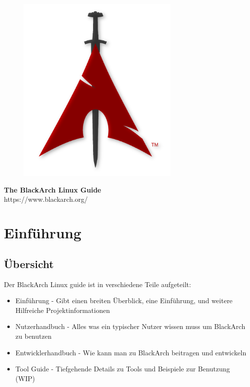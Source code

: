 \documentclass[a4paper, oneside, 11pt]{book}
\begin{document}
\pagestyle{empty}
\begin{center}
\begin{figure}[htbp]
\centering
\vspace{0.5cm}
\includegraphics[width=8cm]{images/logo.png}
\label{fig:logo}
\end{figure}
\vspace{0.5cm}
\Huge{\textbf{The BlackArch Linux Guide}}\\
\vspace{1cm}
\Large{\color{red}https://www.blackarch.org/}\\
\vspace{0.5cm}
\end{center}
\newpage
\tableofcontents
\newpage
\pagestyle{fancy}


\chapter{Einführung}

\section{Übersicht}
Der BlackArch Linux guide ist in verschiedene Teile aufgeteilt:
\begin{itemize}
\item Einführung - Gibt einen breiten Überblick, eine Einführung, und weitere Hilfreiche Projektinformationen
\item Nutzerhandbuch - Alles was ein typischer Nutzer wissen muss um BlackArch zu benutzen
\item Entwicklerhandbuch - Wie kann man zu BlackArch beitragen und entwickeln
\item Tool Guide - Tiefgehende Details zu Tools und Beispiele zur Benutzung (WIP)
\end{itemize}
\end{document}
